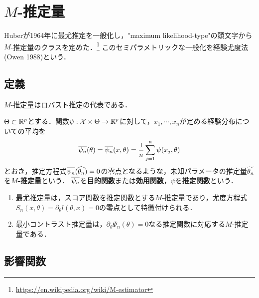 \documentclass[uplatex,dvipdfmx]{jsreport}
\begin{document}
\section{$M$-推定量}

\begin{tcolorbox}[colframe=ForestGreen, colback=ForestGreen!10!white,breakable,colbacktitle=ForestGreen!40!white,coltitle=black,fonttitle=\bfseries\sffamily,
title=]
    Huberが1964年に最尤推定を一般化し，"maximum likelihood-type"の頭文字から$M$-推定量のクラスを定めた．\footnote{\url{https://en.wikipedia.org/wiki/M-estimator}}
    このセミパラメトリックな一般化を経験尤度法(Owen 1988)という．
\end{tcolorbox}

\subsection{定義}

\begin{tcolorbox}[colframe=ForestGreen, colback=ForestGreen!10!white,breakable,colbacktitle=ForestGreen!40!white,coltitle=black,fonttitle=\bfseries\sffamily,
title=]
    $M$-推定量はロバスト推定の代表である．
\end{tcolorbox}

\begin{definition}
    $\Theta\subset\mathbb{R}^p$とする．関数$\psi:\mathcal{X}\times\Theta\to\mathbb{R}^p$に対して，$x_1,\cdots,x_n$が定める経験分布についての平均を
    \[\overline{\psi_n}(\theta)=\overline{\psi_n}(x,\theta)=\frac{1}{n}\sum^n_{j=1}\psi(x_j,\theta)\]
    とおき，推定方程式$\overline{\psi_n}(\widehat{\theta_n})=0$の零点となるような，未知パラメータの推定量$\widetilde{\theta_n}$を\textbf{$M$-推定量}という．
    $\overline{\psi_n}$を\textbf{目的関数}または\textbf{効用関数}，$\psi$を\textbf{推定関数}という．
\end{definition}

\begin{example}\mbox{}
    \begin{enumerate}
        \item 最尤推定量は，スコア関数を推定関数とする$M$-推定量であり，尤度方程式$S_n(x,\theta)=\partial_\theta l(\theta,x)=0$の零点として特徴付けられる．
        \item 最小コントラスト推定量は，$\partial_\theta\Psi_n(\theta)=0$なる推定関数に対応する$M$-推定量である．
    \end{enumerate}
\end{example}

\subsection{影響関数}
\end{document}
